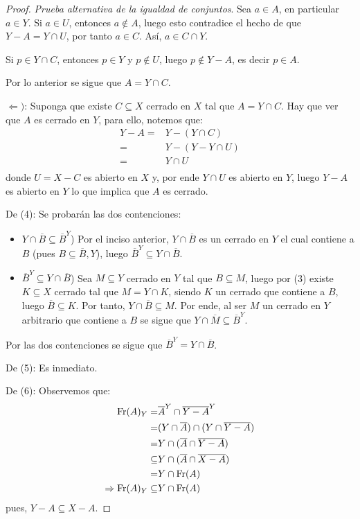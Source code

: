 \documentclass[12pt]{report}
\theoremstyle{largebreak}
\newcommand{\Cls}[1]{\ensuremath{\overline{#1}}}
\newcommand{\Fr}[1]{\ensuremath{\textup{Fr}(#1)}}
\begin{document}
\begin{proof}
        \textit{Prueba alternativa de la igualdad de conjuntos}. Sea $a\in A$, en particular $a\in Y$. Si $a\in U$, entonces $a\notin A$, luego esto contradice el hecho de que $Y-A=Y\cap U$, por tanto $a\in C$. Así, $a\in C\cap Y$.

        Si $p\in Y\cap C$, entonces $p\in Y$ y $p\notin U$, luego $p\notin Y-A$, es decir $p\in A$.

        Por lo anterior se sigue que $A=Y\cap C$.

        $\Leftarrow)$: Suponga que existe $C\subseteq X$ cerrado en $X$ tal que $A=Y\cap C$. Hay que ver que $A$ es cerrado en $Y$, para ello, notemos que:
        \begin{equation*}
            \begin{split}
                Y-A=&Y-(Y\cap C) \\
                =&Y-(Y-Y\cap U) \\
                =&Y\cap U \\
            \end{split}
        \end{equation*}
        donde $U=X-C$ es abierto en $X$ y, por ende $Y\cap U$ es abierto en $Y$, luego $Y-A$ es abierto en $Y$ lo que implica que $A$ es cerrado.

        De (4): Se probarán las dos contenciones:
        \begin{itemize}
            \item $Y\cap\Cls{B}\subseteq\Cls{B}^Y$) Por el inciso anterior, $Y\cap\Cls{B}$ es un cerrado en $Y$ el cual contiene a $B$ (pues $B\subseteq\Cls{B},Y$), luego $\Cls{B}^Y\subseteq Y\cap \Cls{B}$.
            \item $\Cls{B}^Y\subseteq Y\cap\Cls{B}$) Sea $M\subseteq Y$ cerrado en $Y$ tal que $B\subseteq M$, luego por (3) existe $K\subseteq X$ cerrado tal que $M=Y\cap K$, siendo $K$ un cerrado que contiene a $B$, luego $\Cls{B}\subseteq K$. Por tanto, $Y\cap \Cls{B}\subseteq M$. Por ende, al ser $M$ un cerrado en $Y$ arbitrario que contiene a $B$ se sigue que $Y\cap\Cls{M}\subseteq \Cls{B}^Y$.
        \end{itemize}

        Por las dos contenciones se sigue que $\Cls{B}^Y=Y\cap\Cls{B}$.

        De (5): Es inmediato.

        De (6): Observemos que:
        \begin{equation*}
            \begin{split}
                \Fr{A}_Y=&\Cls{A}^Y\cap\Cls{Y-A}^Y\\
                =&(Y\cap\Cls{A})\cap(Y\cap\Cls{Y-A})\\
                =&Y\cap(\Cls{A}\cap\Cls{Y-A}) \\
                \subseteq&Y\cap(\Cls{A}\cap\Cls{X-A}) \\
                =&Y\cap\Fr{A}\\
                \Rightarrow \Fr{A}_Y\subseteq& Y\cap\Fr{A}\\
            \end{split}
        \end{equation*}
        pues, $Y-A\subseteq X-A$.


\end{proof}
\end{document}
